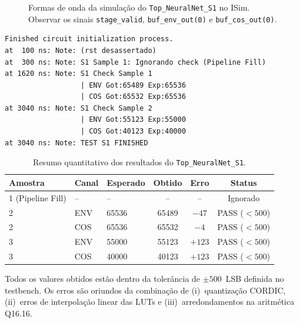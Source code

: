 \documentclass[a4paper,12pt]{article}
\begin{document}
\begin{figure}[H]
\centering
{}
\caption{Formas de onda da simula\c{c}\~ao do \texttt{Top\_NeuralNet\_S1} no ISim. Observar
         os sinais \texttt{stage\_valid}, \texttt{buf\_env\_out(0)} e \texttt{buf\_cos\_out(0)}.}
\label{fig:wave_top_s1}
\end{figure}

\begin{lstlisting}[style=logstyle,
    caption={Log de sa\'ida do ISim -- \texttt{Top\_NeuralNet\_S1}.},
    label={lst:log_top_s1}]
Finished circuit initialization process.
at  100 ns: Note: (rst desassertado)
at  300 ns: Note: S1 Sample 1: Ignorando check (Pipeline Fill)
at 1620 ns: Note: S1 Check Sample 1
                  | ENV Got:65489 Exp:65536
                  | COS Got:65532 Exp:65536
at 3040 ns: Note: S1 Check Sample 2
                  | ENV Got:55123 Exp:55000
                  | COS Got:40123 Exp:40000
at 3040 ns: Note: TEST S1 FINISHED
\end{lstlisting}

\begin{table}[H]
\centering
\caption{Resumo quantitativo dos resultados do \texttt{Top\_NeuralNet\_S1}.}
\label{tab:top_s1_results}
\small
\begin{tabular}{lllccc}
\hline
\textbf{Amostra} & \textbf{Canal} & \textbf{Esperado} & \textbf{Obtido} & \textbf{Erro} & \textbf{Status} \\
\hline
1 (Pipeline Fill) & --  & --     & --     & --   & Ignorado \\
\hline
2 & ENV & 65536  & 65489  & $-47$  & PASS ($<500$) \\
2 & COS & 65536  & 65532  & $-4$   & PASS ($<500$) \\
\hline
3 & ENV & 55000  & 55123  & $+123$ & PASS ($<500$) \\
3 & COS & 40000  & 40123  & $+123$ & PASS ($<500$) \\
\hline
\end{tabular}
\end{table}

Todos os valores obtidos est\~ao dentro da toler\^ancia de $\pm 500$~LSB definida no testbench.
Os erros s\~ao oriundos da combina\c{c}\~ao de (i)~quantiza\c{c}\~ao CORDIC, (ii)~erros de
interpola\c{c}\~ao linear das LUTs e (iii)~arredondamentos na aritm\'etica Q16.16.
\end{document}
